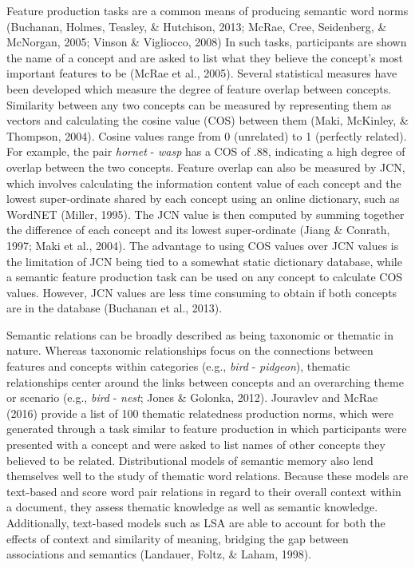 \documentclass[english,man]{apa6}
\theoremstyle{definition}
\theoremstyle{definition}
\theoremstyle{definition}
\theoremstyle{remark}
\begin{document}
Feature production tasks are a common means of producing semantic word
norms (Buchanan, Holmes, Teasley, \& Hutchison, 2013; McRae, Cree,
Seidenberg, \& McNorgan, 2005; Vinson \& Vigliocco, 2008) In such tasks,
participants are shown the name of a concept and are asked to list what
they believe the concept's most important features to be (McRae et al.,
2005). Several statistical measures have been developed which measure
the degree of feature overlap between concepts. Similarity between any
two concepts can be measured by representing them as vectors and
calculating the cosine value (COS) between them (Maki, McKinley, \&
Thompson, 2004). Cosine values range from 0 (unrelated) to 1 (perfectly
related). For example, the pair \emph{hornet} - \emph{wasp} has a COS of
.88, indicating a high degree of overlap between the two concepts.
Feature overlap can also be measured by JCN, which involves calculating
the information content value of each concept and the lowest
super-ordinate shared by each concept using an online dictionary, such
as WordNET (Miller, 1995). The JCN value is then computed by summing
together the difference of each concept and its lowest super-ordinate
(Jiang \& Conrath, 1997; Maki et al., 2004). The advantage to using COS
values over JCN values is the limitation of JCN being tied to a somewhat
static dictionary database, while a semantic feature production task can
be used on any concept to calculate COS values. However, JCN values are
less time consuming to obtain if both concepts are in the database
(Buchanan et al., 2013).

Semantic relations can be broadly described as being taxonomic or
thematic in nature. Whereas taxonomic relationships focus on the
connections between features and concepts within categories (e.g.,
\emph{bird} - \emph{pidgeon}), thematic relationships center around the
links between concepts and an overarching theme or scenario (e.g.,
\emph{bird} - \emph{nest}; Jones \& Golonka, 2012). Jouravlev and McRae
(2016) provide a list of 100 thematic relatedness production norms,
which were generated through a task similar to feature production in
which participants were presented with a concept and were asked to list
names of other concepts they believed to be related. Distributional
models of semantic memory also lend themselves well to the study of
thematic word relations. Because these models are text-based and score
word pair relations in regard to their overall context within a
document, they assess thematic knowledge as well as semantic knowledge.
Additionally, text-based models such as LSA are able to account for both
the effects of context and similarity of meaning, bridging the gap
between associations and semantics (Landauer, Foltz, \& Laham, 1998).
\end{document}
